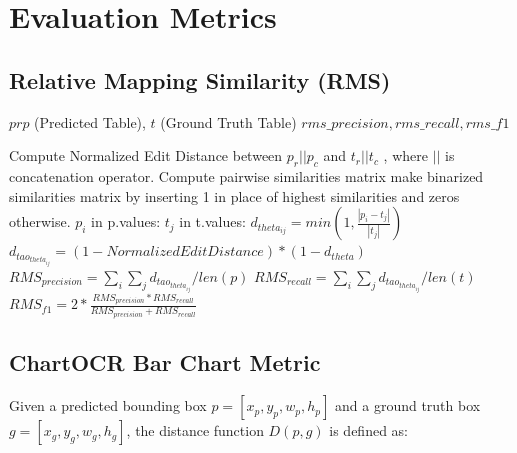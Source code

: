 \documentclass[
	letterpaper, %
]{jdf}
\begin{document}
\appendix
\section{Evaluation Metrics}\label{app:metrics}
\subsection{Relative Mapping Similarity (RMS)}\label{app:rms-algorithm}
\begin{algorithm}
    \begin{algorithmic}[1]
 \Require $prp$ (Predicted Table), $t$ (Ground Truth Table)
        \Ensure $rms\_precision, rms\_recall, rms\_f1$

        Compute Normalized Edit Distance between $p_r || p_c$ and $t_r || t_c$
    , where $||$ is concatenation operator.
        Compute pairwise similarities matrix
        make binarized similarities matrix by inserting 1 in place of highest similarities and zeros otherwise.
        \For $p_i$ in p.values:
        \For $t_j$ in t.values:
        $d_{theta_{ij}} = min(1, \frac{|p_i - t_j|}{|t_j|})$
        $d_{tao_{theta_{ij}}} = (1-Normalized Edit Distance) * (1-d_{theta})$
        \EndFor
        \EndFor
        $RMS_{precision} = \sum_{i} \sum_j d_{tao_{theta_{ij}}} / len(p)$
        $RMS_{recall} = \sum_{i} \sum_j d_{tao_{theta_{ij}}} / len(t)$
        $RMS_{f1} = 2 * \frac{RMS_{precision} * RMS_{recall}}{RMS_{precision} + RMS_{recall}}$
    \end{algorithmic}
\end{algorithm}

\subsection{ChartOCR Bar Chart Metric}

Given a predicted bounding box $p = [x_p, y_p, w_p, h_p]$ and a ground truth box $g = [x_g, y_g, w_g, h_g]$, the distance function $D(p, g)$ is defined as:
\end{document}
